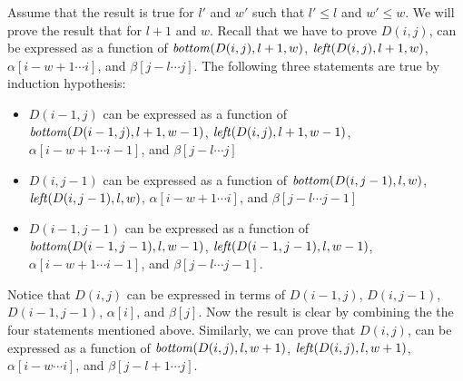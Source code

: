 \documentclass[12pt]{article}
\begin{document}
Assume that the result is true for $l'$ and $w'$ such that $l' \leq l$ and
$w' \leq w$.  We will prove the result that for $l+1$ and $w$. Recall that
we have to prove $D(i,j)$, can be expressed as a function of ${\it
bottom}(D(i,j),l+1,w)$, ${\it left}(D(i,j),l+1,w)$, $ \alpha [ i-w+1
\cdots i ]$, and $\beta [ j-l \cdots j]$.  The following three statements are true
by induction hypothesis:
\begin{itemize}
\item $D(i-1,j)$ can be expressed as a function of ${\it
bottom}(D(i-1,j),l+1,w-1)$, ${\it left}(D(i,j),l+1,w-1)$, $ \alpha [ i-w+1
\cdots i-1 ]$, and $\beta [ j-l \cdots j]$

\item $D(i,j-1)$ can be expressed as a function of ${\it
bottom}(D(i,j-1),l,w)$, ${\it left}(D(i,j-1),l,w)$, $ \alpha [ i-w+1
\cdots i ]$, and $\beta [ j-l \cdots j-1]$

\item $D(i-1,j-1)$ can be expressed as a function of ${\it
bottom}(D(i-1,j-1),l,w-1)$, ${\it left}(D(i-1,j-1),l,w-1)$, $ \alpha [ i-w+1
\cdots i-1 ]$, and $\beta [ j-l \cdots j-1]$.
\end{itemize}
Notice that $D(i,j)$
can be expressed in terms of $D(i-1,j)$, $D(i,j-1)$, $D(i-1,j-1)$, 
$\alpha[i]$,  and $\beta[j]$. Now the result is clear by combining the
the four statements mentioned above. Similarly, we can prove that $D(i,j)$, can be expressed as a function of ${\it
bottom}(D(i,j),l,w+1)$, ${\it left}(D(i,j),l,w+1)$, $ \alpha [ i-w
\cdots i ]$, and $\beta [ j-l+1 \cdots j]$.
\end{document}
